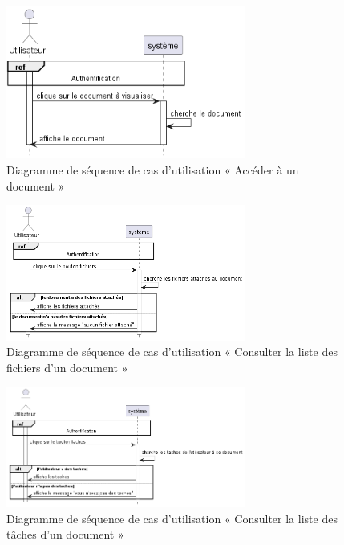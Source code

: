\begin{figure}[H]
  \centering
  \includegraphics[width=0.7\textwidth]{out/diagrams/documents/preview/preview_document}
  \caption{Diagramme de séquence de cas d'utilisation « Accéder à un document  »}
  \label{fig:sequence_Accederaundocument}
\end{figure}
\begin{figure}[H]
  \centering
  \includegraphics[width=0.7\textwidth]{out/diagrams/documents/previewFiles/preview_files_document}
  \caption{Diagramme de séquence de cas d'utilisation « Consulter la liste des fichiers d'un document  »}
  \label{fig:sequence_previewFiles}
\end{figure}
\begin{figure}[H]
  \centering
  \includegraphics[width=0.7\textwidth]{out/diagrams/documents/previewTasks/preview_tasks_document}
  \caption{Diagramme de séquence de cas d'utilisation « Consulter la liste des tâches d'un document  »}
  \label{fig:sequence_previewTasks}
\end{figure}
